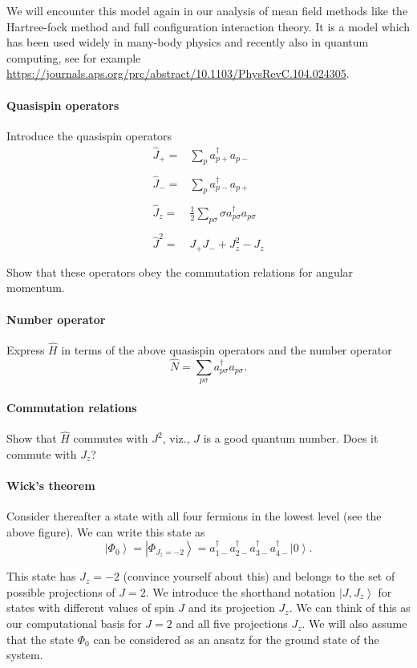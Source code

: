 \documentclass[prc]{revtex4}
\newcommand{\ket}[1]{\left| #1 \right\rangle}
\begin{document}
We will encounter this model again in our analysis of mean field methods like
the Hartree-fock method and full configuration interaction theory. It is a model which has been used widely in many-body physics and recently also in quantum computing, see for example \url{https://journals.aps.org/prc/abstract/10.1103/PhysRevC.104.024305}.


\paragraph{Quasispin operators}
Introduce the quasispin operators
\[
\begin{array}{ll}
\hat{J}_{+}=&\sum_{p}
a_{p+}^{\dagger}a_{p-}\\
&\\
\hat{J}_{-}=&\sum_{p}
a_{p-}^{\dagger}a_{p+}\\
&\\
\hat{J}_{z}=&\frac{1}{2}\sum_{p\sigma}\sigma
a_{p\sigma}^{\dagger}a_{p\sigma}\\
&\\
\hat{J}^{2}=&J_{+}J_{-}+J_{z}^{2}-J_{z}\\
&\\
\end{array}
\]
Show that these operators obey the commutation relations for angular momentum.
\paragraph{Number operator}
Express $\hat{H}$ in terms of the above quasispin operators and the number operator
\[
\hat{N}=\sum_{p\sigma}
a_{p\sigma}^{\dagger}a_{p\sigma}.
\]
\paragraph{Commutation relations}
Show that $\hat{H}$ commutes with $J^{2}$, viz., $J$ is a good quantum number. Does it commute with $J_z$?
\paragraph{Wick's theorem}
Consider thereafter a state with all four fermions in the lowest level (see the above figure).
We can write this state as
\[
\ket{\Phi_0}=\ket{\Phi_{J_z=-2}} =a_{1-}^{\dagger}a_{2-}^{\dagger}
a_{3-}^{\dagger}a_{4-}^{\dagger}\ket{0}.
\]

This state has $J_{z}=-2$ (convince yourself about this) and belongs
to the set of possible projections of $J=2$.  We introduce the
shorthand notation $\ket{J,J_z}$ for states with different values of
spin $J$ and its projection $J_z$.  We can think of this as our
computational basis for $J=2$ and all five projections $J_z$.  We will
also assume that the state $\Phi_0$ can be considered as an ansatz for
the ground state of the system.
\end{document}
